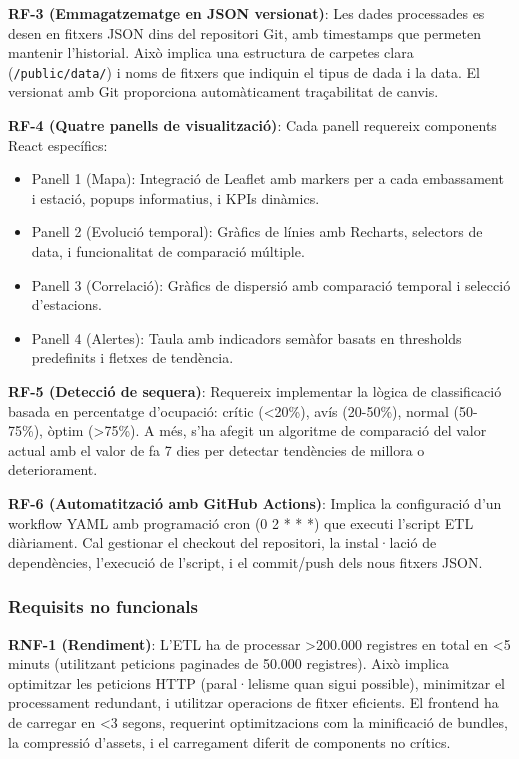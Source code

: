 \textbf{RF-3 (Emmagatzematge en JSON versionat)}: Les dades processades es desen en fitxers JSON dins del repositori Git, amb timestamps que permeten mantenir l'historial. Això implica una estructura de carpetes clara (\texttt{/public/data/}) i noms de fitxers que indiquin el tipus de dada i la data. El versionat amb Git proporciona automàticament traçabilitat de canvis.

\textbf{RF-4 (Quatre panells de visualització)}: Cada panell requereix components React específics:
\begin{itemize}
    \item Panell 1 (Mapa): Integració de Leaflet amb markers per a cada embassament i estació, popups informatius, i KPIs dinàmics.
    \item Panell 2 (Evolució temporal): Gràfics de línies amb Recharts, selectors de data, i funcionalitat de comparació múltiple.
    \item Panell 3 (Correlació): Gràfics de dispersió amb comparació temporal i selecció d'estacions.
    \item Panell 4 (Alertes): Taula amb indicadors semàfor basats en thresholds predefinits i fletxes de tendència.
\end{itemize}

\textbf{RF-5 (Detecció de sequera)}: Requereix implementar la lògica de classificació basada en percentatge d'ocupació: crític (<20\%), avís (20-50\%), normal (50-75\%), òptim (>75\%). A més, s'ha afegit un algoritme de comparació del valor actual amb el valor de fa 7 dies per detectar tendències de millora o deteriorament.

\textbf{RF-6 (Automatització amb GitHub Actions)}: Implica la configuració d'un workflow YAML amb programació cron (0 2 * * *) que executi l'script ETL diàriament. Cal gestionar el checkout del repositori, la instal·lació de dependències, l'execució de l'script, i el commit/push dels nous fitxers JSON.

\subsubsection{Requisits no funcionals}

\textbf{RNF-1 (Rendiment)}: L'ETL ha de processar >200.000 registres en total en <5 minuts (utilitzant peticions paginades de 50.000 registres). Això implica optimitzar les peticions HTTP (paral·lelisme quan sigui possible), minimitzar el processament redundant, i utilitzar operacions de fitxer eficients. El frontend ha de carregar en <3 segons, requerint optimitzacions com la minificació de bundles, la compressió d'assets, i el carregament diferit de components no crítics.

